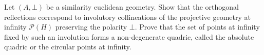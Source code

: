 Let $(A, \bot)$ be a similarity euclidean geometry. Show that the orthogonal reflections correspond to involutory collineations of the projective geometry at infinity $\mathcal{P}(H)$ preserving the polarity $\bot$. Prove that the set of points at infinity fixed by such an involution forms a non-degenerate quadric, called the absolute quadric or the circular points at infinity.
